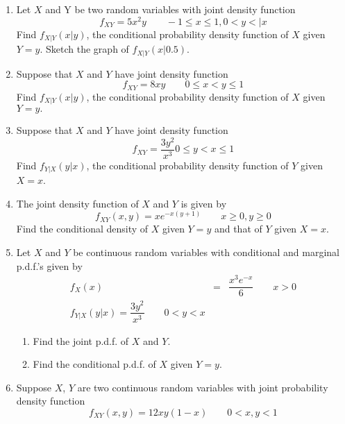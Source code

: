 \begin{exercises}
\begin{enumerate}
\item %
Let $X$ and Y be two random variables with joint density function
$$f_{XY}=5x^2y \qquad -1 \leq x \leq 1, 0 < y < |x$$
Find $f_{X|Y}(x|y)$, the conditional probability density function of $X$ given $Y =
y.$ Sketch the graph of $f_{X|Y}(x|0.5).$



\item %
Suppose that $X$ and $Y$ have joint density function
$$f_{XY} = 8xy \qquad 0 \leq x < y \leq 1$$
Find $f_{X|Y}(x|y)$, the conditional probability density function of $X$ given $Y =
y.$



\item %
Suppose that $X$ and $Y$ have joint density function
$$f_{XY}=\dfrac{3y^2}{x^3} 0 \leq y <x \leq 1$$
Find $f_{Y|X}(y|x)$, the conditional probability density function of $Y$ given $X=x$.

\item %
The joint density function of $X$ and $Y$ is given by
$$f_{XY}(x,y) = xe^{-x(y+1)}\qquad x \geq 0, y \geq 0$$
Find the conditional density of $X$ given $Y = y$ and that of $Y$ given $X = x$.



\item %
Let $X$ and $Y$ be continuous random variables with conditional and marginal
p.d.f.’s given by
\begin{eqnarray*}
  f_X(x) &=& \dfrac{x^3e^{-x}}{6} \qquad x>0 \\
  f_{Y|X}(y|x) = \dfrac{3y^2}{x^3} \qquad 0<y<x
\end{eqnarray*}

\begin{enumerate}
  \setlength\itemsep{-0.5ex}
  \item Find the joint p.d.f. of $X$ and $Y$.
  \item Find the conditional p.d.f. of $X$ given $Y = y$.
\end{enumerate}


\item %
Suppose $X$, $Y$ are two continuous random variables with joint probability
density function
$$f_{XY}(x,y) = 12xy(1-x) \qquad 0<x,y<1$$



\end{enumerate}
\end{exercises}
